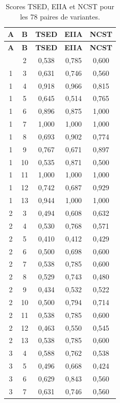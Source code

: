 \documentclass[12pt,a4paper,oneside]{report}
\begin{document}
\begingroup
\small
\begin{longtable}{ccccc}
\caption{Scores TSED, EIIA et NCST pour les 78 paires de variantes.}
\label{tab:paires_completes}\\
\toprule
\textbf{A} & \textbf{B} & \textcolor{tsedcol}{\textbf{TSED}} &
\textcolor{eiiacol}{\textbf{EIIA}} & \textcolor{ncstcol}{\textbf{NCST}} \\
\midrule
\endfirsthead
\toprule
\textbf{A} & \textbf{B} & \textcolor{tsedcol}{\textbf{TSED}} &
\textcolor{eiiacol}{\textbf{EIIA}} & \textcolor{ncstcol}{\textbf{NCST}} \\
\midrule
\endhead
\bottomrule
\endfoot
1 & 2 & 0,538 & 0,785 & 0,600 \\
1 & 3 & 0,631 & 0,746 & 0,560 \\
1 & 4 & 0,918 & 0,966 & 0,815 \\
1 & 5 & 0,645 & 0,514 & 0,765 \\
1 & 6 & 0,896 & 0,875 & 1,000 \\
1 & 7 & 1,000 & 1,000 & 1,000 \\
1 & 8 & 0,693 & 0,902 & 0,774 \\
1 & 9 & 0,767 & 0,671 & 0,897 \\
1 & 10 & 0,535 & 0,871 & 0,500 \\
1 & 11 & 1,000 & 1,000 & 1,000 \\
1 & 12 & 0,742 & 0,687 & 0,929 \\
1 & 13 & 0,944 & 1,000 & 1,000 \\
2 & 3 & 0,494 & 0,608 & 0,632 \\
2 & 4 & 0,530 & 0,768 & 0,571 \\
2 & 5 & 0,410 & 0,412 & 0,429 \\
2 & 6 & 0,500 & 0,698 & 0,600 \\
2 & 7 & 0,538 & 0,785 & 0,600 \\
2 & 8 & 0,529 & 0,743 & 0,480 \\
2 & 9 & 0,434 & 0,532 & 0,522 \\
2 & 10 & 0,500 & 0,794 & 0,714 \\
2 & 11 & 0,538 & 0,785 & 0,600 \\
2 & 12 & 0,463 & 0,550 & 0,545 \\
2 & 13 & 0,538 & 0,785 & 0,600 \\
3 & 4 & 0,588 & 0,762 & 0,538 \\
3 & 5 & 0,496 & 0,668 & 0,424 \\
3 & 6 & 0,629 & 0,843 & 0,560 \\
3 & 7 & 0,631 & 0,746 & 0,560 \\

\end{longtable}
\end{document}
